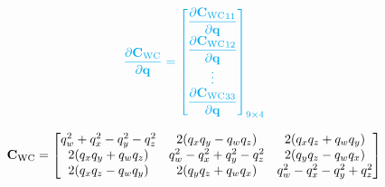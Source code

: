 \begin{align}
  \color{cyan}
  \dfrac{\partial{{{{{{{\mathbf{C}}}}_{{\text{W}}{\text{C}}}}}}}}{\partial{{{\mathbf{q}}}}} =
  \begin{bmatrix}
    \dfrac{\partial{{{{{{{\mathbf{C}}}}_{{\text{W}}{\text{C}}}}}}_{11}}}{\partial{{{\mathbf{q}}}}} \\
    \dfrac{\partial{{{{{{{\mathbf{C}}}}_{{\text{W}}{\text{C}}}}}}_{12}}}{\partial{{{\mathbf{q}}}}} \\
    \vdots \\
    \dfrac{\partial{{{{{{{\mathbf{C}}}}_{{\text{W}}{\text{C}}}}}}_{33}}}{\partial{{{\mathbf{q}}}}}
  \end{bmatrix}_{9 \times 4}
\end{align}

\begin{equation}
  {{{{{{\mathbf{C}}}}_{{\text{W}}{\text{C}}}}}} = \begin{bmatrix}
    q_{w}^{2} + q_{x}^{2} - q_{y}^{2} - q_{z}^{2}
    & 2 (q_{x} q_{y} - q_{w} q_{z})
    & 2 (q_{x} q_{z} + q_{w} q_{y}) \\
    2 (q_{x} q_{y} + q_{w} q_{z})
    & q_{w}^{2} - q_{x}^{2} + q_{y}^{2} - q_{z}^{2}
    & 2 (q_{y} q_{z} - q_{w} q_{x}) \\
    2 (q_{x} q_{z} - q_{w} q_{y})
    & 2 (q_{y} q_{z} + q_{w} q_{x})
    & q_{w}^{2} - q_{x}^{2} - q_{y}^{2} + q_{z}^{2}
  \end{bmatrix}
  \nonumber
\end{equation}

